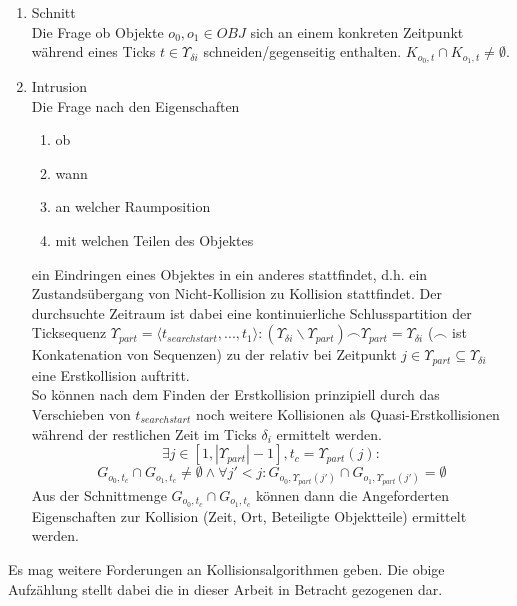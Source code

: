 \begin{enumerate}
	\item Schnitt\\
		Die Frage ob Objekte $o_0,o_1 \in OBJ$ sich an einem konkreten Zeitpunkt während eines Ticks $t\in \Upsilon_{\delta i}$ schneiden/gegenseitig enthalten. $K_{o_0, t} \cap K_{o_1, t} \neq \emptyset$.
	\item Intrusion\\
		Die Frage nach den Eigenschaften
		\begin{enumerate}
		\item ob
		\item wann
		\item an welcher Raumposition
		\item mit welchen Teilen des Objektes
		\end{enumerate}
		ein Eindringen eines Objektes in ein anderes stattfindet, d.h. ein Zustandsübergang von Nicht-Kollision zu Kollision stattfindet.
		Der durchsuchte Zeitraum ist dabei eine kontinuierliche Schlusspartition der Ticksequenz $\Upsilon_{part} = \langle t_{searchstart}, ..., t_1 \rangle : (\Upsilon_{\delta i}\backslash \Upsilon_{part}) \smallfrown \Upsilon_{part} = \Upsilon_{\delta i} $ ($\smallfrown$ ist Konkatenation von Sequenzen) zu der relativ bei Zeitpunkt $j \in \Upsilon_{part} \subseteq \Upsilon_{\delta i}$ eine Erstkollision auftritt.\\
		So können nach dem Finden der Erstkollision prinzipiell durch das Verschieben von $t_{searchstart}$ noch weitere Kollisionen als Quasi-Erstkollisionen während der restlichen Zeit im Ticks $\delta_i$ ermittelt werden.
		$$\exists j \in [1, |\Upsilon_{part}|-1], t_c= \Upsilon_{part}(j):$$
		$$ G_{o_0, t_c}\cap G_{o_1, t_c} \neq \emptyset \wedge \forall j' < j: 
		G_{o_0, \Upsilon_{part}(j')}\cap G_{o_1, \Upsilon_{part}(j')} = \emptyset$$
		Aus der Schnittmenge $G_{o_0, t_c}\cap G_{o_1, t_c}$ können dann die Angeforderten Eigenschaften zur Kollision (Zeit, Ort, Beteiligte Objektteile) ermittelt werden.
\end{enumerate}
Es mag weitere Forderungen an Kollisionsalgorithmen geben. Die obige Aufzählung stellt dabei die in dieser Arbeit in Betracht gezogenen dar.

